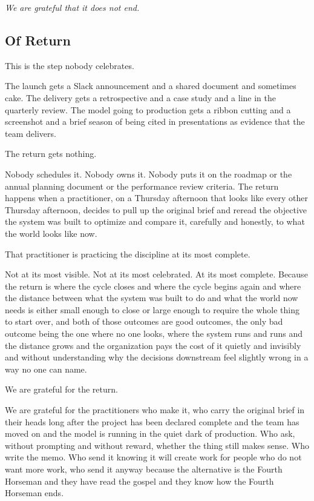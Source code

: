 \textit{We are grateful that it does not end.}

\subsection*{Of Return}

This is the step nobody celebrates.

The launch gets a Slack announcement and a shared document and sometimes cake. The delivery gets a retrospective and a case study and a line in the quarterly review. The model going to production gets a ribbon cutting and a screenshot and a brief season of being cited in presentations as evidence that the team delivers.

The return gets nothing.

Nobody schedules it. Nobody owns it. Nobody puts it on the roadmap or the annual planning document or the performance review criteria. The return happens when a practitioner, on a Thursday afternoon that looks like every other Thursday afternoon, decides to pull up the original brief and reread the objective the system was built to optimize and compare it, carefully and honestly, to what the world looks like now.

That practitioner is practicing the discipline at its most complete.

Not at its most visible. Not at its most celebrated. At its most complete. Because the return is where the cycle closes and where the cycle begins again and where the distance between what the system was built to do and what the world now needs is either small enough to close or large enough to require the whole thing to start over, and both of those outcomes are good outcomes, the only bad outcome being the one where no one looks, where the system runs and runs and the distance grows and the organization pays the cost of it quietly and invisibly and without understanding why the decisions downstream feel slightly wrong in a way no one can name.

We are grateful for the return.

We are grateful for the practitioners who make it, who carry the original brief in their heads long after the project has been declared complete and the team has moved on and the model is running in the quiet dark of production. Who ask, without prompting and without reward, whether the thing still makes sense. Who write the memo. Who send it knowing it will create work for people who do not want more work, who send it anyway because the alternative is the Fourth Horseman and they have read the gospel and they know how the Fourth Horseman ends.

